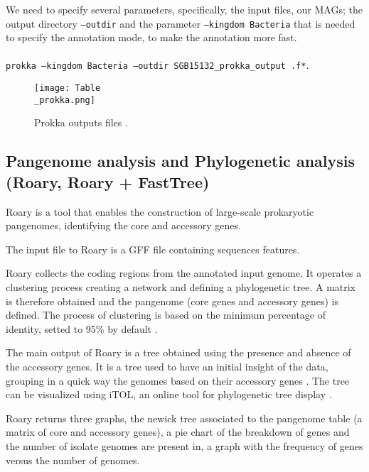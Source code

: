\documentclass[a4paper,titlepage, oneside]{book}
\newcommand{\code}[1]{\colorbox{light-gray}{\texttt{#1}}}
\begin{document}
We need to specify several parameters, specifically, the input files, our MAGs; the output directory \code{--outdir} and the parameter \code{--kingdom Bacteria} that is needed to specify the annotation mode, to make the annotation more fast.
\\ \newline \\
\code{prokka --kingdom Bacteria --outdir SGB15132\_prokka\_output .f*}.


\begin{figure}[ht]
\centering
\texttt{[image: Table\\\_prokka.png]}
\caption{Prokka outputs files \cite{Prokka}.}
\label{fig:prokka-output}
\end{figure}

\subsection{Pangenome analysis and Phylogenetic analysis (Roary, Roary + FastTree)}

Roary is a tool that enables the construction of large-scale prokaryotic pangenomes, identifying the core and accessory genes.

The input file to Roary is a GFF file containing sequences features. 

Roary collects the coding regions from the annotated input genome. It operates a clustering process creating a network and defining a phylogenetic tree. A matrix is therefore obtained and the pangenome (core genes and accessory genes) is defined.  The process of clustering is based on the minimum percentage of identity, setted to 95\% by default \cite{Roary}.

The main output of Roary is a tree obtained using the presence and absence of the accessory genes. It is a tree used to have an initial insight of the data, grouping in a quick way the genomes based on their accessory genes \cite{Roary}. The tree can be visualized using iTOL, an online tool for phylogenetic tree display \cite{iTOL}.

Roary returns three graphs, the newick tree associated to the pangenome table (a matrix of core and accessory genes), a pie chart of the breakdown of genes and the number of isolate genomes are present in, a graph with the frequency of genes versus the number of genomes. \cite{Roary-outputs}
\end{document}
